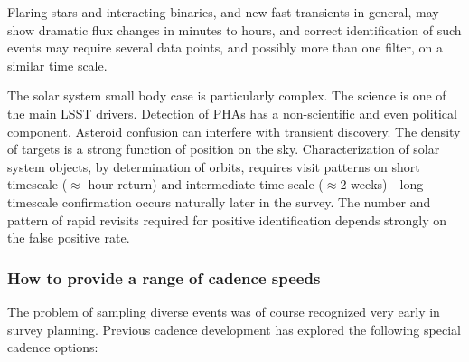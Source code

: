 Flaring stars and interacting binaries, and new fast transients in general, may show dramatic flux changes
in minutes to hours, and correct identification of such events may
require several data points, and possibly more than one filter, on a
similar time scale.

The solar system small body case is particularly complex.  The science
is one of the main LSST drivers.  Detection of PHAs has a non-scientific
and even political component. Asteroid confusion can interfere with
transient discovery. The density of targets is a strong function of
position on the sky.  Characterization of solar system objects, by
determination of orbits, requires visit patterns on short timescale
($\approx$ hour return) and intermediate time scale ($\approx$2 weeks) -
long timescale confirmation occurs naturally later in the survey.  The
number and pattern of rapid revisits required for positive
identification depends strongly on the false positive rate.


\subsubsection{How to provide a range of cadence speeds}

The problem of sampling diverse events was of course recognized very
early in survey planning. Previous cadence development has explored the
following special cadence options:

